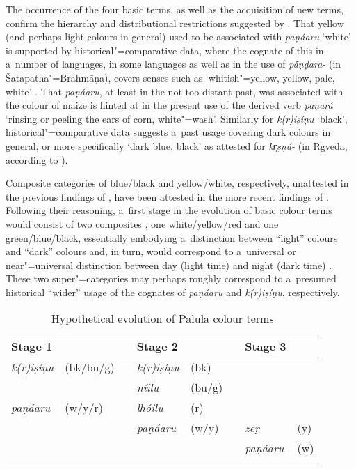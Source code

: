 The occurrence of the four basic terms, as well as the acquisition of new terms, confirm the hierarchy and distributional restrictions suggested by \citet[2--5]{berlinkay1969}. That yellow (and perhaps light colours in general) used to be associated with \textit{paṇáaru} `white' is supported by historical"=comparative data, where the cognate of this in a~number of \iliNIA languages, in some \iliMIA languages as well as in the \iliOIA use of \textit{p\'{\={a}}ṇḍara-} (in Šatapatha"=Brahmāṇa), covers senses such as `whitish"=yellow, yellow, pale, white' \citep[8047]{turner1966}. That \textit{paṇáaru}, at least in the not too distant past, was associated with the colour of maize is hinted at in the present use of the derived verb \textit{paṇará} `rinsing or peeling the ears of corn, white"=wash'. Similarly for \textit{k(r)iṣíṇu} `black', historical"=comparative data suggests a~past usage covering dark colours in general, or more specifically `dark blue, black' as attested for \iliOIA \textit{kr̥ṣṇá-} (in Rgveda, according to \citealt[3451]{turner1966}). 



Composite categories of blue/black and yellow/white, respectively, unattested in the previous findings of \citet{berlinkay1969}, have been attested in the more recent findings of \citet[17]{kayetal1991}. Following their reasoning, a~first stage in the evolution of basic colour terms would consist of two composites \citep[19]{kayetal1991}, one white/yellow/red and one green/blue/black, essentially embodying a~distinction between ``light'' colours and ``dark'' colours and, in turn, would correspond to a~universal or near"=universal distinction between day (light time) and night (dark time) \citep[288]{wierzbicka1996}. These two super"=categories may perhaps roughly correspond to a~presumed historical ``wider'' usage of the cognates of \textit{paṇáaru} and \textit{k(r)iṣíṇu}, respectively. 



\begin{table}[ht]
\caption{Hypothetical evolution of Palula colour terms}
\begin{tabularx}{\textwidth}{ Q Q l Q Q l Q Q }
\lsptoprule
Stage 1 &
&
&
Stage 2 &
&
&
Stage 3 &
\\\hline
\textit{k(r)iṣíṇu} &
(bk/bu/g) &
 &
\textit{k(r)iṣíṇu} &
(bk) &
&
&
\\
&
&
 &
\textit{níilu} &
(bu/g) &
&
&
\\
\textit{paṇáaru} &
(w/y/r) &
&
\textit{lhóilu} &
(r) &
&
&
\\
&
&
&
\textit{paṇáaru} &
(w/y) &
&
\textit{zeṛ} &
(y)\\
&
&
&
&
&
&
\textit{paṇáaru} &
(w)\\\lspbottomrule
\end{tabularx}
\label{tab:6-1}
\end{table}


